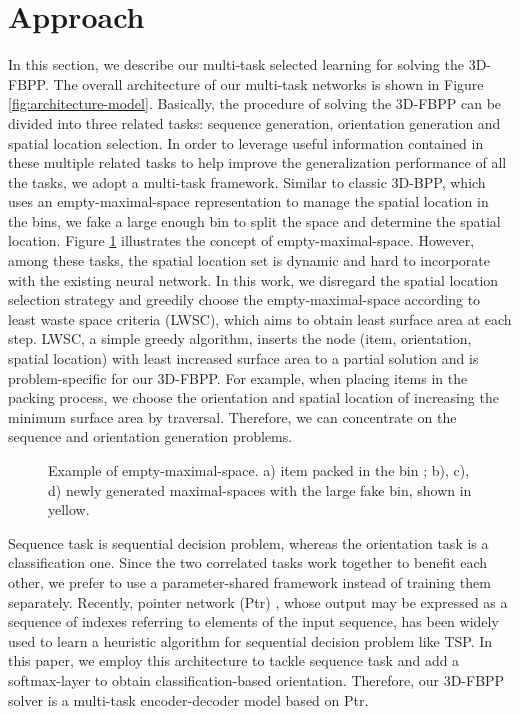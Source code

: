 \section{Approach}
\label{sec:model}
In this section, we describe our multi-task selected learning for solving the 3D-FBPP.
The overall architecture of our multi-task networks is shown in Figure \ref{fig:architecture-model}.
Basically, the procedure of solving the 3D-FBPP can be divided into three related tasks: sequence generation, orientation generation and spatial location selection. In order to leverage useful information contained in these multiple related tasks to help improve the generalization performance of all the tasks, we adopt a multi-task framework. Similar to classic 3D-BPP, which uses an empty-maximal-space representation to manage the spatial location in the bins, we fake a large enough bin to split the space and determine the spatial location. Figure \ref{fig:freespace} illustrates the concept of empty-maximal-space. However, among these tasks, the spatial location set is dynamic and hard to incorporate with the existing neural network. In this work, we disregard the spatial location selection strategy and greedily choose the empty-maximal-space according to least waste space criteria (LWSC), which aims to obtain least surface area at each step. 
LWSC, a simple greedy algorithm, inserts the node (item, orientation, spatial location) with least increased surface area to a partial solution and is problem-specific for our 3D-FBPP. For example, when placing items in the packing process, we choose the orientation and spatial location of increasing the minimum surface area by traversal. Therefore, we can concentrate on the sequence and orientation generation problems.  %
\begin{figure}[h]
	\centering
	\caption{Example of empty-maximal-space. a) item packed in the bin ; b), c), d) newly generated maximal-spaces with the large fake bin, shown in yellow. }
	\label{fig:freespace}
	\vspace{-10pt}
\end{figure}

Sequence task is sequential decision problem, whereas the orientation task is a classification one. Since the two correlated tasks work together to benefit each other, we prefer to use a parameter-shared framework instead of training them separately. 
Recently, pointer network (Ptr) \cite{bahdanau2014neural}, whose output may be expressed as a sequence of indexes referring to elements of the input sequence, has been widely used to learn a heuristic algorithm for sequential decision problem like TSP. In this paper, we employ this architecture to tackle sequence task and add a softmax-layer to obtain classification-based orientation. Therefore, our 3D-FBPP solver is a multi-task encoder-decoder model based on Ptr.

